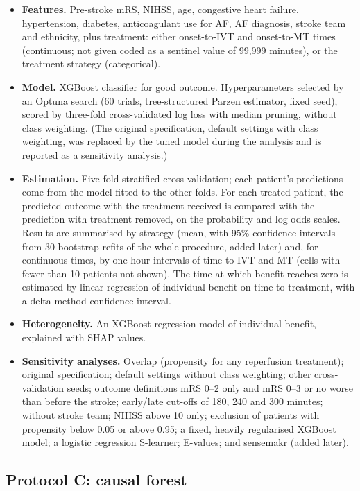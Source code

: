 \begin{itemize}
\item \textbf{Features.} Pre-stroke mRS, NIHSS, age, congestive heart failure, hypertension, diabetes, anticoagulant use for AF, AF diagnosis, stroke team and ethnicity, plus treatment: either onset-to-IVT and onset-to-MT times (continuous; not given coded as a sentinel value of 99,999 minutes), or the treatment strategy (categorical).
\item \textbf{Model.} XGBoost classifier for good outcome. Hyperparameters selected by an Optuna search (60 trials, tree-structured Parzen estimator, fixed seed), scored by three-fold cross-validated log loss with median pruning, without class weighting. (The original specification, default settings with class weighting, was replaced by the tuned model during the analysis and is reported as a sensitivity analysis.)
\item \textbf{Estimation.} Five-fold stratified cross-validation; each patient's predictions come from the model fitted to the other folds. For each treated patient, the predicted outcome with the treatment received is compared with the prediction with treatment removed, on the probability and log odds scales. Results are summarised by strategy (mean, with 95\% confidence intervals from 30 bootstrap refits of the whole procedure, added later) and, for continuous times, by one-hour intervals of time to IVT and MT (cells with fewer than 10 patients not shown). The time at which benefit reaches zero is estimated by linear regression of individual benefit on time to treatment, with a delta-method confidence interval.
\item \textbf{Heterogeneity.} An XGBoost regression model of individual benefit, explained with SHAP values.
\item \textbf{Sensitivity analyses.} Overlap (propensity for any reperfusion treatment); original specification; default settings without class weighting; other cross-validation seeds; outcome definitions mRS 0--2 only and mRS 0--3 or no worse than before the stroke; early/late cut-offs of 180, 240 and 300 minutes; without stroke team; NIHSS above 10 only; exclusion of patients with propensity below 0.05 or above 0.95; a fixed, heavily regularised XGBoost model; a logistic regression S-learner; E-values; and sensemakr (added later).
\end{itemize}

\subsection{Protocol C: causal forest}\label{sec:protocol_cf}

